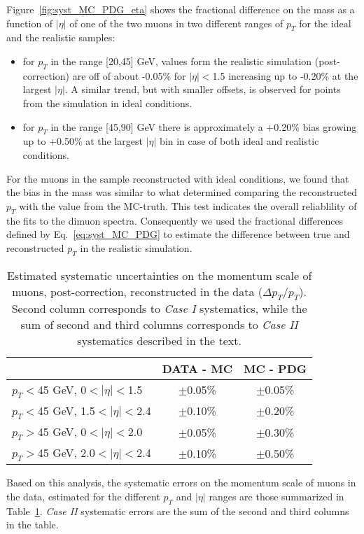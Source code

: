 Figure~\ref{fig:syst_MC_PDG_eta} shows the fractional difference on
the mass as a function of $|\eta|$ of one of the two muons in two
different ranges of $p_T$ for the ideal and the realistic samples:
\begin{itemize}
\item for $p_T$ in the range [20,45] GeV, values
form the realistic simulation (post-correction) are off of about -0.05\%
for $|\eta|<$1.5 increasing up to -0.20\% at the largest $|\eta|$.
A similar trend, but with smaller offsets, is observed for points from the simulation in ideal
conditions. 
\item for $p_T$ in the range [45,90] GeV there is approximately
a +0.20\% bias growing up to +0.50\% at the largest $|\eta|$ bin
in case of both ideal and realistic conditions. 
\end{itemize}
For the muons in the sample reconstructed with ideal conditions, 
we found that the bias in the mass was similar to what determined
comparing the reconstructed $p_T$ with the value from the
MC-truth. This test indicates the overall reliablility of the fits
to the dimuon spectra. Consequently we used the fractional differences
defined by Eq.~\ref{eq:syst_MC_PDG} to estimate the difference between 
true and reconstructed $p_T$ in the realistic simulation.

\begin{table}[h]
\begin{center}
\caption{Estimated systematic uncertainties on the momentum scale
  of muons, post-correction, reconstructed in the data ($\Delta p_T/p_T$).
  Second column corresponds to {\sl Case I} systematics, while
  the sum of second and third columns corresponds to {\sl Case II}
  systematics described in the text.\label{tab:systematics}} 
\begin{tabular}{|l|c|c|}
\hline
 & DATA - MC & MC - PDG \\
\hline 
$p_T<$45 GeV,   0$<|\eta|<$1.5 & $\pm$0.05\%& $\pm$0.05\% \\
$p_T<$45 GeV, 1.5$<|\eta|<$2.4 & $\pm$0.10\%& $\pm$0.20\% \\
$p_T>$45 GeV,   0$<|\eta|<$2.0 & $\pm$0.05\%& $\pm$0.30\% \\
$p_T>$45 GeV, 2.0$<|\eta|<$2.4 & $\pm$0.10\%& $\pm$0.50\% \\
\hline
\hline
\end{tabular}
\end{center}
\end{table}


Based on this analysis, the systematic errors on the momentum scale of
muons in the data, estimated for the
different $p_T$ and $|\eta|$ ranges are those summarized in
Table~\ref{tab:systematics}. {\sl Case II} systematic errors are the sum of the
second and third columns in the table.
